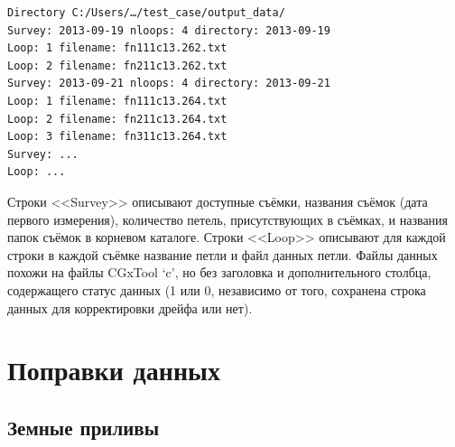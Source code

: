 \begin{verbatim}
Directory C:/Users/…/test_case/output_data/
Survey: 2013-09-19 nloops: 4 directory: 2013-09-19
Loop: 1 filename: fn111c13.262.txt
Loop: 2 filename: fn211c13.262.txt
Survey: 2013-09-21 nloops: 4 directory: 2013-09-21
Loop: 1 filename: fn111c13.264.txt
Loop: 2 filename: fn211c13.264.txt
Loop: 3 filename: fn311c13.264.txt
Survey: ...
Loop: ...
\end{verbatim}

Строки <<Survey>> описывают доступные съёмки, названия съёмок (дата первого
измерения), количество петель, присутствующих в съёмках, и названия папок
съёмок в корневом каталоге. Строки <<Loop>> описывают для каждой строки в каждой
съёмке название петли и файл данных петли. Файлы данных похожи на файлы CGxTool
‘c’, но без заголовка и дополнительного столбца, содержащего статус данных (1
или 0, независимо от того, сохранена строка данных для корректировки дрейфа или
нет).

\section[Поправки данных]{Поправки данных}
\label{sec:data_corrections}

\subsection[Земные приливы]{Земные приливы}
\label{subsec:earth_tides}

